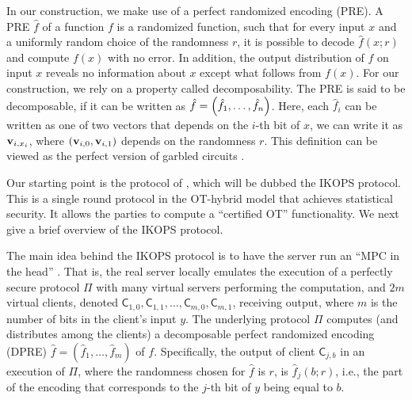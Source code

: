 \documentclass{llncs}
\newcommand{\enote}[1]{\authnote{Eran}{#1}}
\renewcommand{\v}{\myvec{v}}
\newcommand{\Cc}{\mathsf{C}}
\begin{document}
In our construction, we make use of a perfect randomized encoding (PRE). A PRE $\hat{f}$  of a function $f$ \cite{AIK04} is a randomized function, such that for every input $x$ and a uniformly random choice of the randomness $r$, it is possible to decode $\hat{f}(x;r)$ and compute $f(x)$ with no error. In addition, the output distribution of $\hat{f}$ on input $x$ reveals no information about $x$ except what follows from $f(x)$.  For our construction, we rely on a property called decomposability. The PRE is said to be decomposable, if it can be written as $\hat{f}=\left ( \hat{f}_1,\ldots,\hat{f}_n \right )$. Here, each $\hat{f}_i$ can be written as one of two vectors that depends on the $i$-th bit of $x$, \ie we can write it as $\v_{i,x_i}$, where $(\v_{i,0},\v_{i,1})$ depends on the randomness $r$. This definition can be viewed as the perfect version of garbled circuits \cite{Yao82,lindell2009proof}.



Our starting point is the protocol of \citet{IKOPS11}, which will be dubbed the IKOPS protocol. This is a  single round protocol in the OT-hybrid model that achieves statistical security. It allows the parties to compute a ``certified OT'' functionality. We next give a brief overview of the IKOPS protocol. 

The main idea behind the IKOPS protocol is to have the server run an ``MPC in the head'' \cite{IPS08} \enote{give citation}. That is, the real server locally emulates the execution of a perfectly secure protocol $\Pi$ with many virtual servers performing the computation, and $2m$ virtual clients, denoted $\Cc_{1,0},\Cc_{1,1},\ldots,\Cc_{m,0},\Cc_{m,1}$, receiving output, where $m$ is the number of bits in the client's input $y$. The underlying protocol $\Pi$  computes (and distributes among the clients) a decomposable perfect randomized encoding (DPRE) $\hat{f} = (\hat{f}_1,\ldots,\hat{f}_m)$ of $f$. Specifically, the output of client $\Cc_{j,b}$ in an execution of $\Pi$, where the randomness chosen for $\hat{f}$ is $r$, is $\hat{f}_j(b;r)$, i.e., the part of the encoding that corresponds to the $j$-th bit of $y$ being equal to $b$. 
\end{document}
